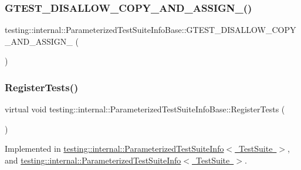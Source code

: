 \subsubsection{\texorpdfstring{GTEST\_DISALLOW\_COPY\_AND\_ASSIGN\_()}{GTEST\_DISALLOW\_COPY\_AND\_ASSIGN\_()}\hspace{0.1cm}{\footnotesize\ttfamily [2/2]}}
{\footnotesize\ttfamily testing\+::internal\+::\+Parameterized\+Test\+Suite\+Info\+Base\+::\+G\+T\+E\+S\+T\+\_\+\+D\+I\+S\+A\+L\+L\+O\+W\+\_\+\+C\+O\+P\+Y\+\_\+\+A\+N\+D\+\_\+\+A\+S\+S\+I\+G\+N\+\_\+ (\begin{DoxyParamCaption}\item[{\mbox{\hyperlink{classtesting_1_1internal_1_1_parameterized_test_suite_info_base}{Parameterized\+Test\+Suite\+Info\+Base}}}]{ }\end{DoxyParamCaption})\hspace{0.3cm}{\ttfamily [private]}}

\mbox{\label{classtesting_1_1internal_1_1_parameterized_test_suite_info_base_a41d7d663014af0c1e614c5a61293cb5a}} 
\subsubsection{\texorpdfstring{RegisterTests()}{RegisterTests()}\hspace{0.1cm}{\footnotesize\ttfamily [1/2]}}
{\footnotesize\ttfamily virtual void testing\+::internal\+::\+Parameterized\+Test\+Suite\+Info\+Base\+::\+Register\+Tests (\begin{DoxyParamCaption}{ }\end{DoxyParamCaption})\hspace{0.3cm}{\ttfamily [pure virtual]}}



Implemented in \mbox{\hyperlink{classtesting_1_1internal_1_1_parameterized_test_suite_info_a8c0af866d3c291a63d3f4581ccd452d1}{testing\+::internal\+::\+Parameterized\+Test\+Suite\+Info$<$ Test\+Suite $>$}}, and \mbox{\hyperlink{classtesting_1_1internal_1_1_parameterized_test_suite_info_a8c0af866d3c291a63d3f4581ccd452d1}{testing\+::internal\+::\+Parameterized\+Test\+Suite\+Info$<$ Test\+Suite $>$}}.

